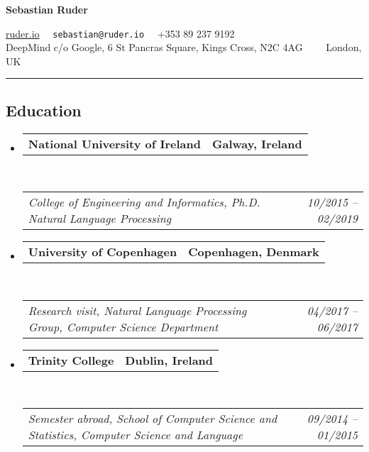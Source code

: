 \documentclass[10pt,letterpaper]{article}
\makeatletter
\newcommand{\headerrow}[2]
{\begin{tabular*}{\linewidth}{l@{\extracolsep{\fill}}r}
	#1 &
	#2 \\
\end{tabular*}}
\makeatother
\begin{document}
\begin{center}
{\LARGE \textbf{Sebastian Ruder}}

\url{ruder.io} \textbullet
\ \ \texttt{sebastian@ruder.io} \textbullet
\ \ +353 89 237 9192 
\\
DeepMind c/o Google, 6 St Pancras Square, Kings Cross, N2C 4AG\ \ \textbullet
\ \ London, UK
\end{center}


\hrule
\vspace{-0.4em}
\subsection*{Education}

\begin{itemize}
	\parskip=0.1em
	
	\item 
	\headerrow
		{\textbf{National University of Ireland}}
		{\textbf{Galway, Ireland}}
	\\
	\headerrow
		{\emph{College of Engineering and Informatics, Ph.D. Natural Language Processing}}
		{\emph{10/2015 -- 02/2019}}
	
	\item 
	\headerrow
		{\textbf{University of Copenhagen}}
		{\textbf{Copenhagen, Denmark}}
	\\
	\headerrow
		{\emph{Research visit, Natural Language Processing Group, Computer Science Department}}
		{\emph{04/2017 -- 06/2017}}

		\item 
	\headerrow
		{\textbf{Trinity College}}
		{\textbf{Dublin, Ireland}}
	\\
	\headerrow
		{\emph{Semester abroad, School of Computer Science and Statistics, Computer Science and Language}}
		{\emph{09/2014 -- 01/2015}}


\end{itemize}
\end{document}
